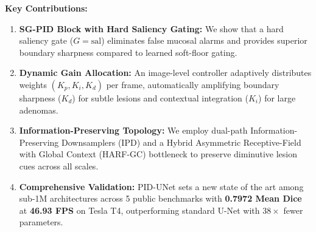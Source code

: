 \documentclass[conference]{IEEEtran}
\begin{document}
\noindent\textbf{Key Contributions:}
\begin{enumerate}
    \item \textbf{SG-PID Block with Hard Saliency Gating:} We show that a hard saliency gate ($G = \text{sal}$) eliminates false mucosal alarms and provides superior boundary sharpness compared to learned soft-floor gating.
    \item \textbf{Dynamic Gain Allocation:} An image-level controller adaptively distributes weights $(K_p, K_i, K_d)$ per frame, automatically amplifying boundary sharpness ($K_d$) for subtle lesions and contextual integration ($K_i$) for large adenomas.
    \item \textbf{Information-Preserving Topology:} We employ dual-path Information-Preserving Downsamplers (IPD) and a Hybrid Asymmetric Receptive-Field with Global Context (HARF-GC) bottleneck to preserve diminutive lesion cues across all scales.
    \item \textbf{Comprehensive Validation:} PID-UNet sets a new state of the art among sub-1M architectures across 5 public benchmarks with \textbf{0.7972 Mean Dice} at \textbf{46.93 FPS} on Tesla T4, outperforming standard U-Net with $38\times$ fewer parameters.
\end{enumerate}
\end{document}
